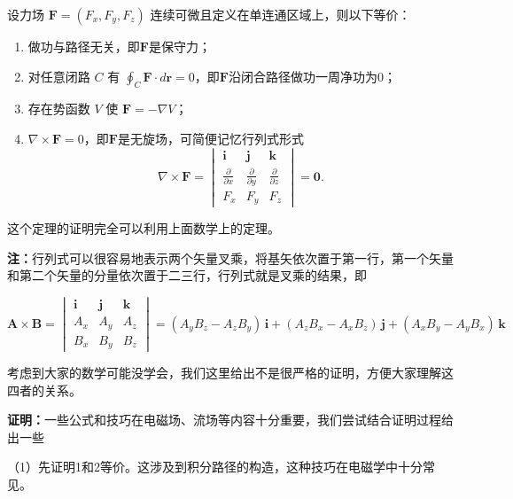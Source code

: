 \begin{tcolorbox}[colback=white!5!white, colframe=green!50!black, title=保守力的等价定义]
    设力场 \(\mathbf{F}=(F_x,F_y,F_z)\) 连续可微且定义在单连通区域上，则以下等价：
    \begin{enumerate}
        \item 做功与路径无关，即$\mathbf{F}$是保守力；
        \item 对任意闭路 \(C\) 有 \(\oint_C \mathbf{F}\cdot d\mathbf{r}=0\)，即$\mathbf{F}$沿闭合路径做功一周净功为0；
        \item 存在势函数 \(V\) 使 \(\mathbf{F}=-\nabla V\)；
        \item \(\nabla\times\mathbf{F}=0\)，即$\mathbf{F}$是无旋场，可简便记忆行列式形式
              \[\nabla\times\mathbf{F} =
                  \begin{vmatrix}
                      \mathbf{i}                  & \mathbf{j}                  & \mathbf{k}                  \\[2pt]
                      \frac{\partial}{\partial x} & \frac{\partial}{\partial y} & \frac{\partial}{\partial z} \\[2pt]
                      F_x                         & F_y                         & F_z
                  \end{vmatrix} = \mathbf{0}.
              \]
    \end{enumerate}
\end{tcolorbox}

这个定理的证明完全可以利用上面数学上的定理。

\noindent\textbf{注：}行列式可以很容易地表示两个矢量叉乘，将基矢依次置于第一行，第一个矢量和第二个矢量的分量依次置于二三行，行列式就是叉乘的结果，即

\[
    \mathbf{A} \times \mathbf{B} =
    \begin{vmatrix}
        \mathbf{i} & \mathbf{j} & \mathbf{k} \\
        A_x        & A_y        & A_z        \\
        B_x        & B_y        & B_z
    \end{vmatrix}
    = (A_y B_z - A_z B_y)\,\mathbf{i} + (A_z B_x - A_x B_z)\,\mathbf{j} + (A_x B_y - A_y B_x)\,\mathbf{k}
\]

考虑到大家的数学可能没学会，我们这里给出不是很严格的证明，方便大家理解这四者的关系。

\noindent\textbf{证明：}一些公式和技巧在电磁场、流场等内容十分重要，我们尝试结合证明过程给出一些

\noindent（1）先证明1和2等价。这涉及到积分路径的构造，这种技巧在电磁学中十分常见。

